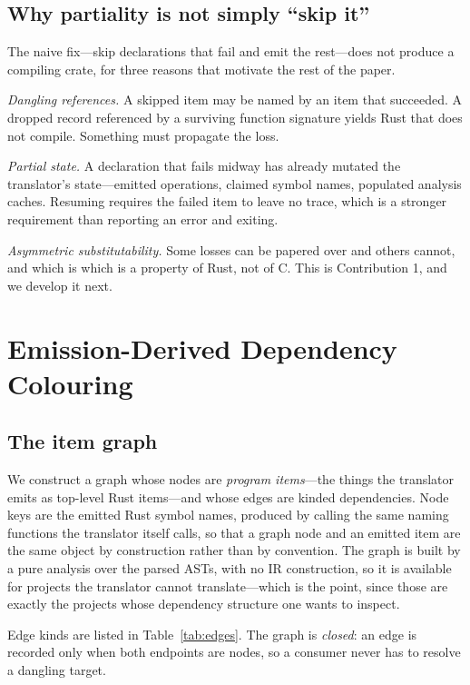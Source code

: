 \documentclass[10pt,twocolumn]{article}
\begin{document}
\subsection{Why partiality is not simply ``skip it''}
\label{sec:why-hard}

The naive fix---skip declarations that fail and emit the rest---does not
produce a compiling crate, for three reasons that motivate the rest of the
paper.

\emph{Dangling references.} A skipped item may be named by an item that
succeeded. A dropped record referenced by a surviving function signature
yields Rust that does not compile. Something must propagate the loss.

\emph{Partial state.} A declaration that fails midway has already mutated the
translator's state---emitted operations, claimed symbol names, populated
analysis caches. Resuming requires the failed item to leave no trace, which is
a stronger requirement than reporting an error and exiting.

\emph{Asymmetric substitutability.} Some losses can be papered over and others
cannot, and which is which is a property of Rust, not of C. This is
Contribution 1, and we develop it next.

\section{Emission-Derived Dependency Colouring}
\label{sec:colouring}

\subsection{The item graph}

We construct a graph whose nodes are \emph{program items}---the things the
translator emits as top-level Rust items---and whose edges are kinded
dependencies. Node keys are the emitted Rust symbol names, produced by calling
the same naming functions the translator itself calls, so that a graph node
and an emitted item are the same object by construction rather than by
convention. The graph is built by a pure analysis over the parsed ASTs, with
no IR construction, so it is available for projects the translator cannot
translate---which is the point, since those are exactly the projects whose
dependency structure one wants to inspect.

Edge kinds are listed in Table~\ref{tab:edges}. The graph is \emph{closed}: an
edge is recorded only when both endpoints are nodes, so a consumer never has
to resolve a dangling target.
\end{document}
